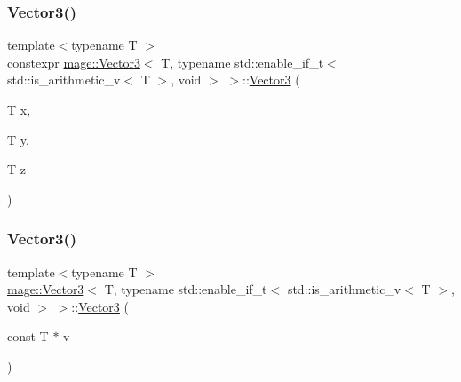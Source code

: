 \subsubsection{\texorpdfstring{Vector3()}{Vector3()}\hspace{0.1cm}{\footnotesize\ttfamily [2/7]}}
{\footnotesize\ttfamily template$<$typename T $>$ \\
constexpr \hyperlink{structmage_1_1_vector3}{mage\+::\+Vector3}$<$ T, typename std\+::enable\+\_\+if\+\_\+t$<$ std\+::is\+\_\+arithmetic\+\_\+v$<$ T $>$, void $>$ $>$\+::\hyperlink{structmage_1_1_vector3}{Vector3} (\begin{DoxyParamCaption}\item[{T}]{x,  }\item[{T}]{y,  }\item[{T}]{z }\end{DoxyParamCaption})\hspace{0.3cm}{\ttfamily [noexcept]}}

\hypertarget{structmage_1_1_vector3_3_01_t_00_01typename_01std_1_1enable__if__t_3_01std_1_1is__arithmetic__v_3_01_t_01_4_00_01void_01_4_01_4_abd114b3da80a3e0f646b8deca52dfb69}{}\label{structmage_1_1_vector3_3_01_t_00_01typename_01std_1_1enable__if__t_3_01std_1_1is__arithmetic__v_3_01_t_01_4_00_01void_01_4_01_4_abd114b3da80a3e0f646b8deca52dfb69} 
\subsubsection{\texorpdfstring{Vector3()}{Vector3()}\hspace{0.1cm}{\footnotesize\ttfamily [3/7]}}
{\footnotesize\ttfamily template$<$typename T $>$ \\
\hyperlink{structmage_1_1_vector3}{mage\+::\+Vector3}$<$ T, typename std\+::enable\+\_\+if\+\_\+t$<$ std\+::is\+\_\+arithmetic\+\_\+v$<$ T $>$, void $>$ $>$\+::\hyperlink{structmage_1_1_vector3}{Vector3} (\begin{DoxyParamCaption}\item[{const T $\ast$}]{v }\end{DoxyParamCaption})\hspace{0.3cm}{\ttfamily [noexcept]}}

